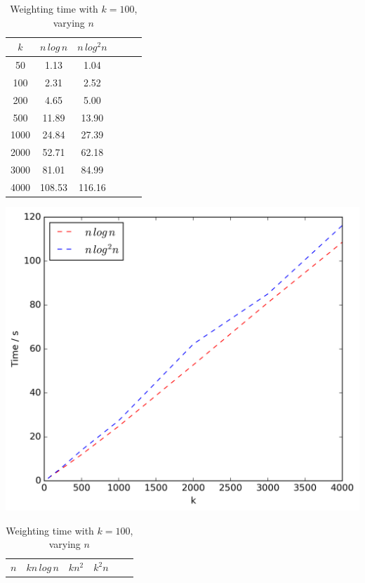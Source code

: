 \documentclass[final,1p,times]{elsarticle}
\begin{document}
\begin{table}[!ht]
\begin{minipage}{0.48\textwidth}
            \centering
            \caption{\texttt{Filter\_Clusters} time with $n = 1000$, varying $k$}
            \label{tab:filterk1}
            \begin{tabular}{c||ccccc}
                $k$ & $n\,log\,n$ & $n\,log^2n$\\
                \hline\hline
                50 & 1.13 & 1.04\\
                100 & 2.31 & 2.52\\
                200 & 4.65 & 5.00\\
                500 & 11.89 & 13.90\\
                1000 & 24.84 & 27.39\\
                2000 & 52.71 & 62.18\\
                3000 & 81.01 & 84.99\\
                4000 & 108.53 & 116.16\\
            \end{tabular}
            \includegraphics[scale=0.4]{varyingk1_filter}
            \vspace{0.5cm}
        \end{minipage}
        \begin{minipage}{0.48\textwidth}
            \centering
            \caption{Weighting time with $k = 100$, varying $n$}
            \label{tab:weightn1}
            \begin{tabular}{c||ccccc}
                $n$ & $kn\,log\,n$ & $kn^2$ & $k^2n$\\

\end{tabular}
\end{minipage}
\end{table}
\end{document}
